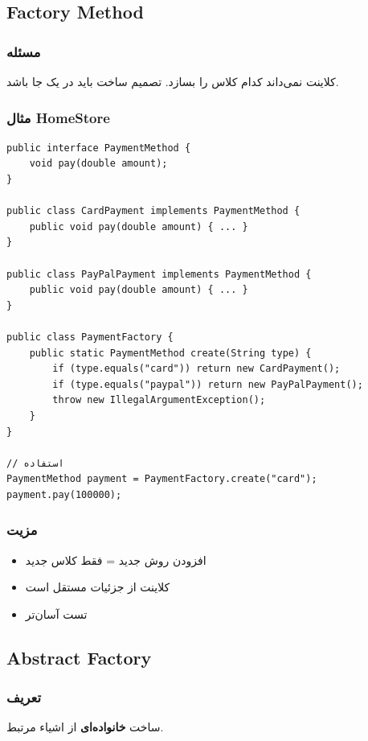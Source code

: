 \documentclass[12pt, a4paper]{article}
\begin{document}
\subsection{Factory Method}

\subsubsection{مسئله}
کلاینت نمی‌داند کدام کلاس را بسازد. تصمیم ساخت باید در یک جا باشد.

\subsubsection{مثال HomeStore}
\begin{lstlisting}
public interface PaymentMethod {
    void pay(double amount);
}

public class CardPayment implements PaymentMethod {
    public void pay(double amount) { ... }
}

public class PayPalPayment implements PaymentMethod {
    public void pay(double amount) { ... }
}

public class PaymentFactory {
    public static PaymentMethod create(String type) {
        if (type.equals("card")) return new CardPayment();
        if (type.equals("paypal")) return new PayPalPayment();
        throw new IllegalArgumentException();
    }
}

// استفاده
PaymentMethod payment = PaymentFactory.create("card");
payment.pay(100000);
\end{lstlisting}

\subsubsection{مزیت}
\begin{itemize}
    \item افزودن روش جدید = فقط کلاس جدید
    \item کلاینت از جزئیات مستقل است
    \item تست آسان‌تر
\end{itemize}

\subsection{Abstract Factory}

\subsubsection{تعریف}
ساخت \textbf{خانواده‌ای} از اشیاء مرتبط.
\end{document}
